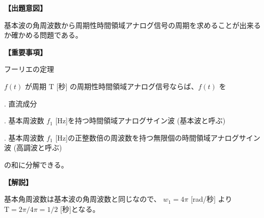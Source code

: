 \noindent \textbf{【出題意図】}

\noindent 基本波の角周波数から周期性時間領域アナログ信号の周期を求めることが出来るか確かめる問題である。

\vspace{1em}
\noindent \textbf{【重要事項】}

\noindent フーリエの定理

\smallskip
$f(t)$ が周期 $\textrm{T}$ [秒] の周期性時間領域アナログ信号ならば、$f(t)$ を

. 直流成分

. 基本周波数 $f_1$ [Hz]を持つ時間領域アナログサイン波 (基本波と呼ぶ)

. 基本周波数 $f_1$ [Hz]の正整数倍の周波数を持つ無限個の時間領域アナログサイン波 (高調波と呼ぶ)

\smallskip
の和に分解できる。


\vspace{1em}
\noindent \textbf{【解説】}

\noindent 基本角周波数は基本波の角周波数と同じなので、 $w_1 = 4\pi$ [rad/秒] より $\textrm{T} = 2\pi/4\pi = 1/2$ [秒]となる。
